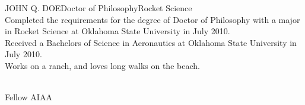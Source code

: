 \newpage
\begin{vita}{JOHN Q. DOE}{Doctor of Philosophy}{Rocket Science} %
     \\ Completed the requirements for the degree of Doctor of Philosophy with a major in Rocket Science at Oklahoma State University in July 2010.  \\ Received a Bachelors of Science in Aeronautics at Oklahoma State University in July 2010.
     \\ Works on a ranch, and loves long walks on the beach.

     \\ Fellow AIAA
\end{vita}
